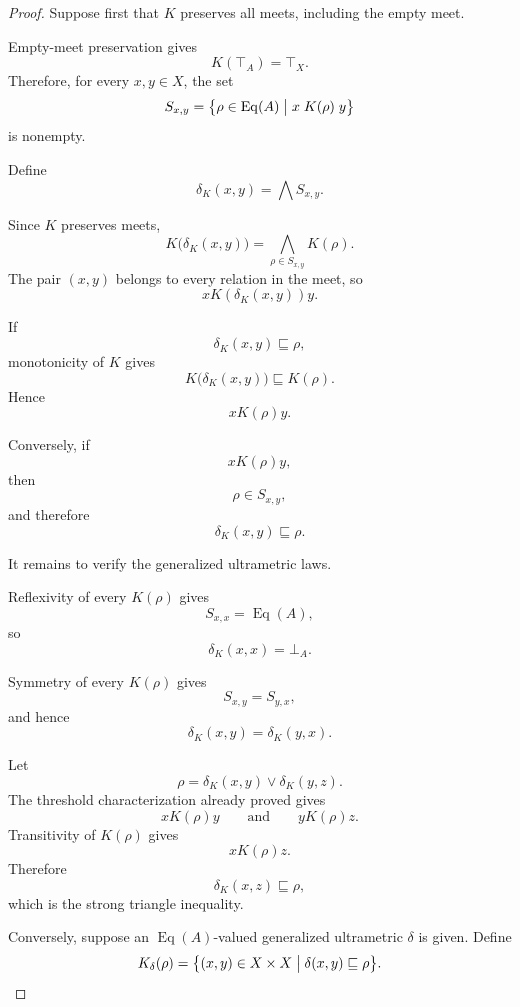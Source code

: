 \documentclass[11pt]{article}
\theoremstyle{plain}
\theoremstyle{definition}
\theoremstyle{remark}
\begin{document}
\begin{proof}
  Suppose first that \(K\)
  preserves all meets,
  including the empty meet.

  Empty-meet preservation gives
  \[
    K(\top_A)
    =
    \top_X.
  \]
  Therefore, for every \(x,y\in X\),
  the set
  \[
    S_{x,y}
    =
    \bigl\{
    \rho
    \in
    \operatorname{Eq}(A)
    \bigm|
    x\mathrel{K(\rho)}y
    \bigr\}
  \]
  is nonempty.

  Define
  \[
    \delta_K(x,y)
    =
    \bigwedge S_{x,y}.
  \]

  Since \(K\) preserves meets,
  \[
    K
    \bigl(
    \delta_K(x,y)
    \bigr)
    =
    \bigwedge_{\rho\in S_{x,y}}
    K(\rho).
  \]
  The pair \((x,y)\)
  belongs to every relation in the meet,
  so
  \[
    x
    \mathrel{
      K
      \left(
      \delta_K(x,y)
      \right)
    }
    y.
  \]

  If
  \[
    \delta_K(x,y)
    \sqsubseteq
    \rho,
  \]
  monotonicity of \(K\) gives
  \[
    K
    \bigl(
    \delta_K(x,y)
    \bigr)
    \sqsubseteq
    K(\rho).
  \]
  Hence
  \[
    x\mathrel{K(\rho)}y.
  \]

  Conversely,
  if
  \[
    x\mathrel{K(\rho)}y,
  \]
  then
  \[
    \rho\in S_{x,y},
  \]
  and therefore
  \[
    \delta_K(x,y)
    \sqsubseteq
    \rho.
  \]

  It remains to verify the generalized ultrametric laws.

  Reflexivity of every \(K(\rho)\)
  gives
  \[
    S_{x,x}
    =
    \operatorname{Eq}(A),
  \]
  so
  \[
    \delta_K(x,x)
    =
    \bot_A.
  \]

  Symmetry of every \(K(\rho)\)
  gives
  \[
    S_{x,y}
    =
    S_{y,x},
  \]
  and hence
  \[
    \delta_K(x,y)
    =
    \delta_K(y,x).
  \]

  Let
  \[
    \rho
    =
    \delta_K(x,y)
    \vee
    \delta_K(y,z).
  \]
  The threshold characterization already proved gives
  \[
    x\mathrel{K(\rho)}y
    \qquad\text{and}\qquad
    y\mathrel{K(\rho)}z.
  \]
  Transitivity of \(K(\rho)\)
  gives
  \[
    x\mathrel{K(\rho)}z.
  \]
  Therefore
  \[
    \delta_K(x,z)
    \sqsubseteq
    \rho,
  \]
  which is the strong triangle inequality.

  Conversely,
  suppose an
  \(\operatorname{Eq}(A)\)-valued
  generalized ultrametric \(\delta\)
  is given.
  Define
  \[
    K_{\delta}(\rho)
    =
    \bigl\{
    (x,y)
    \in
    X\times X
    \bigm|
    \delta(x,y)
    \sqsubseteq
    \rho
    \bigr\}.
  \]


\end{proof}
\end{document}
